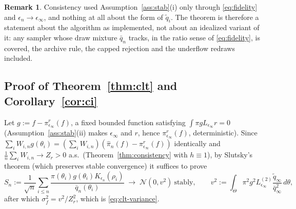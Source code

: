 \documentclass[10pt]{article}
\theoremstyle{plain}
\theoremstyle{definition}
\newtheorem{remark}{Remark}
\begin{document}
\begin{remark}\label{rem:weaker-c4}
Consistency used Assumption~\ref{ass:stab}(i) only through \eqref{eq:fidelity} and $\epsilon_n\to\epsilon_\infty$, and nothing at all about the form of $\tilde q_i$. The theorem is therefore a statement about the algorithm as implemented, not about an idealized variant of it: any sampler whose draw mixture $\bar q_n$ tracks, in the ratio sense of \eqref{eq:fidelity}, is covered, the archive rule, the capped rejection and the underflow redraws included.
\end{remark}

\subsection{Proof of Theorem~\ref{thm:clt} and Corollary~\ref{cor:ci}}\label{app:theory-clt}
Let $g:=f-\pi^r_{\epsilon_\infty}(f)$, a fixed bounded function satisfying $\int\pi gL_{\epsilon_\infty}r=0$ (Assumption~\ref{ass:stab}(ii) makes $\epsilon_\infty$ and $r$, hence $\pi^r_{\epsilon_\infty}(f)$, deterministic). Since $\sum_iW_{i,n}g(\theta_i)=(\sum_iW_{i,n})(\widehat\pi_n(f)-\pi^r_{\epsilon_\infty}(f))$ identically and $\tfrac1n\sum_iW_{i,n}\to Z_r>0$ a.s.\ (Theorem~\ref{thm:consistency} with $h\equiv1$), by Slutsky's theorem (which preserves stable convergence) it suffices to prove
\begin{equation}
S_n:=\frac{1}{\sqrt n}\sum_{i\le n}\frac{\pi(\theta_i)g(\theta_i)K_{\epsilon_n}(\rho_i)}{\bar q_n(\theta_i)}
\;\longrightarrow\;\mathcal{N}(0,v^2)\ \text{stably},
\qquad
v^2:=\int_\Theta\pi^2g^2L^{(2)}_{\epsilon_\infty}\frac{\tilde q_\infty}{\bar q^2_\infty}\,d\theta,
\label{eq:app-clt-target}
\end{equation}
after which $\sigma^2_f=v^2/Z^2_r$, which is \eqref{eq:clt-variance}.
\end{document}
